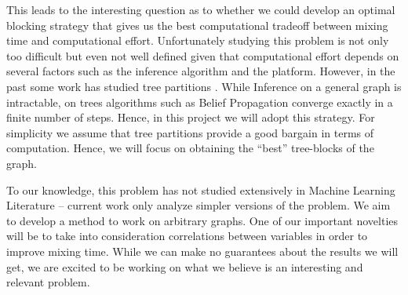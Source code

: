 \documentclass{article} %
\begin{document}
This leads to the interesting question as to whether we could develop an optimal
blocking strategy that gives us the best computational tradeoff between mixing
time and computational effort. Unfortunately studying this problem is not only
too difficult but even not well defined given that computational effort depends
on several factors such as the inference algorithm and the platform.
However, in the past some work has studied tree partitions
\cite{hamze2004fields, hamze2006information, rivasseau2005jungle}.
While Inference on a general graph is intractable, on trees algorithms such as
Belief Propagation 
converge exactly in a finite number of steps. Hence, in this project we will
adopt this strategy. For simplicity we assume that tree partitions provide a
good bargain in terms of computation. Hence, we will focus on obtaining the
``best'' tree-blocks of the graph.

To our knowledge, this problem has not studied extensively in Machine Learning
Literature -- current work only analyze simpler versions of the problem.
We aim to develop a method to work on arbitrary graphs. One of our important
novelties will be to take into consideration correlations between
variables in order to improve mixing time. While we can make no guarantees about
the results we will get, we are excited to be working on what we believe is an
interesting and relevant problem.
\end{document}
